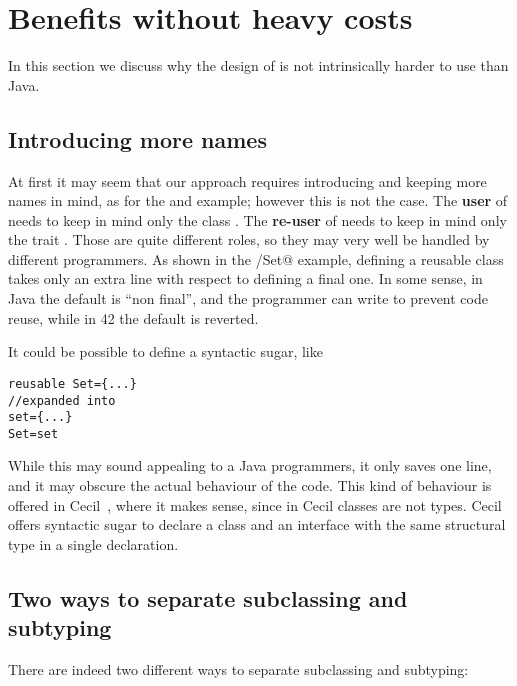 \newpage\appendix

\section{Benefits without heavy costs}
In this section we discuss why the design of \name
is not intrinsically harder to use than Java.


\subsection{Introducing more names}
At first it may seem that our approach requires
introducing and keeping more names in mind, as for the \Q@set@ and \Q@Set@ example;
however this is not the case. 
The \textbf{user} of \Q@Set@ needs to keep in mind
only the class \Q@Set@.
The \textbf{re-user} of \Q@set@ needs to keep in mind only
 the trait \Q@set@.
Those are quite different roles, so they may very well
be handled by different programmers.
As shown in the \Q@set/Set@ example, defining a reusable class
takes only an extra line with respect to defining a final one.
In some sense, in Java the default is ``non final'', and
the programmer can write \Q@final@ to prevent code reuse, while
in 42 the default is reverted.

It could be possible to define a syntactic sugar, like
\begin{lstlisting}
reusable Set={...}
//expanded into
set={...}
Set=set
\end{lstlisting}
While this may sound appealing to a Java programmers, it only saves one line, and it may obscure the actual behaviour of the code.
This kind of behaviour is offered in Cecil~\cite{chambers1995typechecking}, where it makes sense, since in 
Cecil classes are not types.
Cecil offers syntactic sugar to declare a class and an
interface with the same structural type in a single declaration.

\subsection{Two ways to separate subclassing and subtyping}
There are indeed two different ways to separate subclassing and subtyping:

